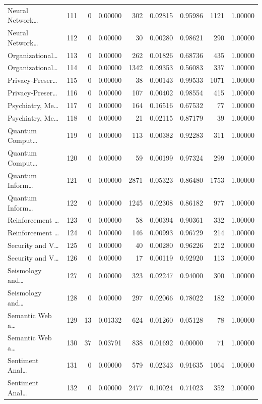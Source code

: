 \begin{table}
\begin{tabular}{lrrrrrrrr}
Neural Network… & 111 & 0 & 0.00000 & 302 & 0.02815 & 0.95986 & 1121 & 1.00000 \\
Neural Network… & 112 & 0 & 0.00000 & 30 & 0.00280 & 0.98621 & 290 & 1.00000 \\
Organizational… & 113 & 0 & 0.00000 & 262 & 0.01826 & 0.68736 & 435 & 1.00000 \\
Organizational… & 114 & 0 & 0.00000 & 1342 & 0.09353 & 0.56083 & 337 & 1.00000 \\
Privacy-Preser… & 115 & 0 & 0.00000 & 38 & 0.00143 & 0.99533 & 1071 & 1.00000 \\
Privacy-Preser… & 116 & 0 & 0.00000 & 107 & 0.00402 & 0.98554 & 415 & 1.00000 \\
Psychiatry, Me… & 117 & 0 & 0.00000 & 164 & 0.16516 & 0.67532 & 77 & 1.00000 \\
Psychiatry, Me… & 118 & 0 & 0.00000 & 21 & 0.02115 & 0.87179 & 39 & 1.00000 \\
Quantum Comput… & 119 & 0 & 0.00000 & 113 & 0.00382 & 0.92283 & 311 & 1.00000 \\
Quantum Comput… & 120 & 0 & 0.00000 & 59 & 0.00199 & 0.97324 & 299 & 1.00000 \\
Quantum Inform… & 121 & 0 & 0.00000 & 2871 & 0.05323 & 0.86480 & 1753 & 1.00000 \\
Quantum Inform… & 122 & 0 & 0.00000 & 1245 & 0.02308 & 0.86182 & 977 & 1.00000 \\
Reinforcement … & 123 & 0 & 0.00000 & 58 & 0.00394 & 0.90361 & 332 & 1.00000 \\
Reinforcement … & 124 & 0 & 0.00000 & 146 & 0.00993 & 0.96729 & 214 & 1.00000 \\
Security and V… & 125 & 0 & 0.00000 & 40 & 0.00280 & 0.96226 & 212 & 1.00000 \\
Security and V… & 126 & 0 & 0.00000 & 17 & 0.00119 & 0.92920 & 113 & 1.00000 \\
Seismology and… & 127 & 0 & 0.00000 & 323 & 0.02247 & 0.94000 & 300 & 1.00000 \\
Seismology and… & 128 & 0 & 0.00000 & 297 & 0.02066 & 0.78022 & 182 & 1.00000 \\
Semantic Web a… & 129 & 13 & 0.01332 & 624 & 0.01260 & 0.05128 & 78 & 1.00000 \\
Semantic Web a… & 130 & 37 & 0.03791 & 838 & 0.01692 & 0.00000 & 71 & 1.00000 \\
Sentiment Anal… & 131 & 0 & 0.00000 & 579 & 0.02343 & 0.91635 & 1064 & 1.00000 \\
Sentiment Anal… & 132 & 0 & 0.00000 & 2477 & 0.10024 & 0.71023 & 352 & 1.00000 \\

\end{tabular}
\end{table}
